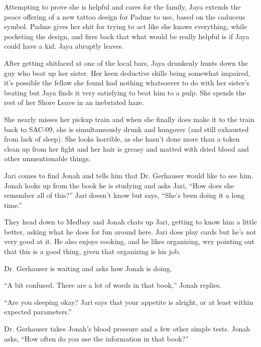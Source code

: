 Attempting to prove she is helpful and cares for the family, Jaya extends the peace offering of a new tattoo design for Padme to use, based on the caduceus symbol.  Padme gives her shit for trying to act like she knows everything, while pocketing the design, and fires back that what would be really helpful is if Jaya could have a kid.  Jaya abruptly leaves.



After getting shitfaced at one of the local bars, Jaya drunkenly hunts down the guy who beat up her sister.  Her keen deductive skills being somewhat impaired, it's possible the fellow she found had nothing whatsoever to do with her sister's beating but Jaya finds it very satisfying to beat him to a pulp.  She spends the rest of her Shore Leave in an inebriated haze.



She nearly misses her pickup train and when she finally does make it to the train back to SAC-09, she is simultaneously drunk and hungover (and still exhausted from lack of sleep).  She looks horrible, as she hasn't done more than a token clean up from her fight and her hair is greasy and matted with dried blood and other unmentionable things.




Jari comes to find Jonah and tells him that Dr. Gerhauser would like to see him.  Jonah looks up from the book he is studying and asks Jari, ``How does she remember all of this?''  Jari doesn't know but says, ``She's been doing it a long time.''



They head down to Medbay and Jonah chats up Jari, getting to know him a little better, asking what he does for fun around here.  Jari does play cards but he's not very good at it.  He also enjoys cooking, and he likes organizing, wry pointing out that this is a good thing, given that organizing is his job.



Dr. Gerhauser is waiting and asks how Jonah is doing.  

``A bit confused.  There are a lot of words in that book,'' Jonah replies.

``Are you sleeping okay?  Jari says that your appetite is alright, or at least within expected parameters.''

Dr. Gerhauser takes Jonah's blood pressure and a few other simple tests.  Jonah asks, ``How often do you use the information in that book?''

